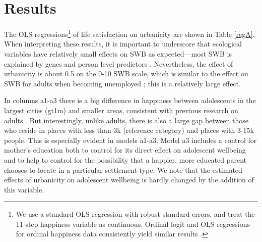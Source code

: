 \documentclass[11pt, letterpaper]{article}
\begin{document}
\begin{spacing}{1.9}
\begin{spacing}{.9}\end{spacing} 

\section*{Results}

The OLS regressions\footnote{We use a standard OLS regression with robust
  standard errors, and treat the 11-step happiness variable as
  continuous. Ordinal logit and OLS regressions for ordinal  happiness data consistently yield similar results \citep{carbonell04}.
%                                                                                                                  
} of life satisfaction on urbanicity are shown in Table \ref{regA}.
When interpreting these results, it is important to underscore that ecological
variables have relatively small effects on SWB as
 expected---most SWB is explained by genes \citep{schnittker08} and person level
 predictors \citep{veenhoven14b}. Nevertheless, the effect of urbanicity is
 about 0.5 on the 0-10 SWB scale,  which is similar to the
effect on SWB for adults when becoming unemployed \citep{clark2008lags}; this is 
a relatively large effect. 
   
In columns a1-a3 %
there is a big difference in happiness between adolescents in the largest cities (gt1m) and smaller areas, consistent with previous research on adults \citep{aok-ls_fisher16}. But interestingly, unlike adults,
there is also a large gap between those who reside in places with less than 3k
(reference category) and places with 3-15k people. This is especially evident in
models a1-a3. %
 Model a3 includes a control for mother's education both to control for its
 direct effect on adolescent wellbeing and to help to control for the
 possibility that a happier, more educated parent chooses to locate in a
 particular settlement type. We note that the estimated effects of urbanicity on
 adolescent wellbeing is hardly changed by the addition of this variable. 



\end{spacing}
\end{document}
